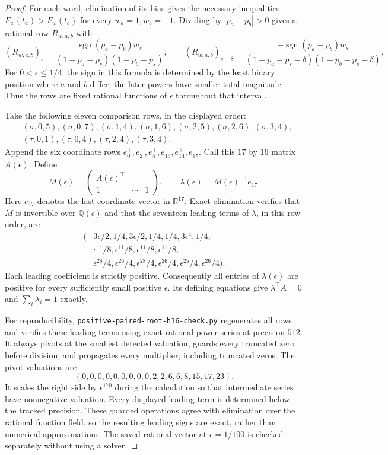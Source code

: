 \documentclass[11pt]{article}
\begin{document}
\begin{proof}
For each word, elimination of its bias gives the necessary inequalities
$F_w(t_a)>F_w(t_b)$ for every $w_a=1,w_b=-1$. Dividing by
$|p_a-p_b|>0$ gives a rational row $R_{w,a,b}$ with
\[
 (R_{w,a,b})_s=
 \frac{\operatorname{sgn}(p_a-p_b)w_s}
 {(1-p_a-p_s)(1-p_b-p_s)},\qquad
 (R_{w,a,b})_{s+8}=
 \frac{-\operatorname{sgn}(p_a-p_b)w_s}
 {(1-p_a-p_s-\delta)(1-p_b-p_s-\delta)}.
\]
For $0<\epsilon\leq1/4$, the sign in this formula is determined
by the least binary position where $a$ and $b$ differ; the later
powers have smaller total magnitude. Thus the rows are fixed rational
functions of $\epsilon$ throughout that interval.

Take the following eleven comparison rows, in the displayed order:
\[
 \begin{split}
 &(\sigma,0,5),(\sigma,0,7),(\sigma,1,4),(\sigma,1,6),
   (\sigma,2,5),(\sigma,2,6),(\sigma,3,4),\\
 &(\tau,0,1),(\tau,0,4),(\tau,2,4),(\tau,3,4).
 \end{split}
\]
Append the six coordinate rows
$e_0^\top,e_2^\top,e_4^\top,e_{13}^\top,e_{14}^\top,e_{15}^\top$.
Call this $17$ by $16$ matrix $A(\epsilon)$. Define
\[
 M(\epsilon)=\begin{pmatrix} A(\epsilon)^\top\\
                      1&\cdots&1\end{pmatrix},\qquad
 \lambda(\epsilon)=M(\epsilon)^{-1}e_{17}.
\]
Here $e_{17}$ denotes the last coordinate vector in $\mathbb R^{17}$.
Exact elimination verifies that $M$ is invertible over
$\mathbb Q(\epsilon)$ and that the seventeen leading terms of
$\lambda$, in this row order, are
\[
 \begin{split}
 (&3\epsilon/2,1/4,3\epsilon/2,1/4,1/4,3\epsilon^4,1/4,\\
 &\epsilon^{11}/8,\epsilon^{11}/8,
   \epsilon^{11}/8,\epsilon^{11}/8,\\
 &\epsilon^{28}/4,\epsilon^{26}/4,\epsilon^{28}/4,
   \epsilon^{26}/4,\epsilon^{25}/4,\epsilon^{26}/4).
 \end{split}
\]
Each leading coefficient is strictly positive. Consequently all
entries of $\lambda(\epsilon)$ are positive for every sufficiently
small positive $\epsilon$. Its defining equations give
$\lambda^\top A=0$ and $\sum_i\lambda_i=1$ exactly.

For reproducibility, \texttt{positive-paired-root-h16-check.py}
regenerates all rows and verifies these leading terms using exact
rational power series at precision $512$. It always pivots at the
smallest detected valuation, guards every truncated zero before
division, and propagates every multiplier, including truncated zeros.
The pivot valuations are
\[
 (0,0,0,0,0,0,0,0,0,2,2,6,6,8,15,17,23).
\]
It scales the right side by $\epsilon^{170}$ during the calculation
so that intermediate series have nonnegative valuation. Every
displayed leading term is determined below the tracked precision.
These guarded operations agree with elimination over the rational
function field, so the resulting leading signs are exact, rather
than numerical approximations. The saved rational vector at
$\epsilon=1/100$ is checked separately without using a solver.


\end{proof}
\end{document}
